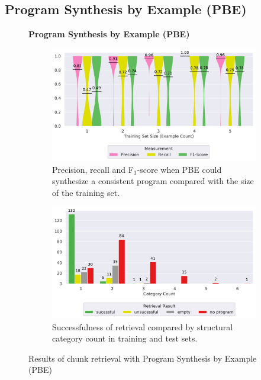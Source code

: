 \subsection{Program Synthesis by Example (PBE)}
\label{sec:r:pbe}
\begin{figure}
\centering
    \textbf{Program Synthesis by Example (PBE)}\par\medskip
\begin{subfigure}[b]{\columnwidth}
		\centering
		\includegraphics[width=\columnwidth,
		clip]{img/big-study/recall-precision-examplecount-sythesisworked-PBE.pdf}
				\caption{Precision, recall and
				F$_{1}$-score when PBE could synthesize
				a consistent program compared with the
				size of the training set.}
		\label{fig:recall-precision-examplecount-sythesisworked-PBE}
\end{subfigure}\hspace{\fill}
\begin{subfigure}[b]{\columnwidth}
		\centering
		\includegraphics[width=\columnwidth,
		clip]{img/big-study/failure-reason-categorycount-PBE.pdf}
				\caption{Successfulness of retrieval
				compared by structural category count in training and test sets.}
		\label{fig:failure-reason-categorycount-PBE}
\end{subfigure}
\caption{Results of chunk retrieval with  Program Synthesis by Example
(PBE)}
\end{figure}


